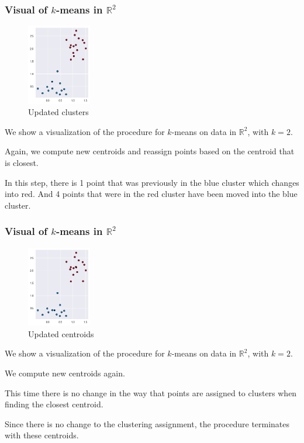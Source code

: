 \documentclass[smaller]{beamer}
\theoremstyle{example}
\begin{document}
\begin{frame}
    \frametitle{Visual of $k$-means in $\mathbb R^2$}
    
    \begin{figure}
        \begin{center}
            \includegraphics[width=0.25\textwidth]{../../Images/kmeans_3.png}
        \end{center}
        \caption{Updated clusters}
    \end{figure}

    We show a visualization of the procedure for $k$-means on data in $\mathbb R^2$, with $k=2$.
    \vspace*{12pt}

    Again, we compute new centroids and reassign points based on the centroid that is closest. 
    
    In this step, there is 1 point that was previously in the blue cluster which changes into red. And 4 points that were in the red cluster have been moved into the blue cluster.

\vfill
\end{frame}

\begin{frame}
    \frametitle{Visual of $k$-means in $\mathbb R^2$}
    
    \begin{figure}
        \begin{center}
            \includegraphics[width=0.25\textwidth]{../../Images/kmeans_4.png}
        \end{center}
        \caption{Updated centroids}
    \end{figure}

    We show a visualization of the procedure for $k$-means on data in $\mathbb R^2$, with $k=2$.
    \vspace*{12pt}

    We compute new centroids again. 
    
    This time there is no change in the way that points are assigned to clusters when finding the closest centroid. 
    
    Since there is no change to the clustering assignment, the procedure terminates with these centroids.

\vfill
\end{frame}
\end{document}
